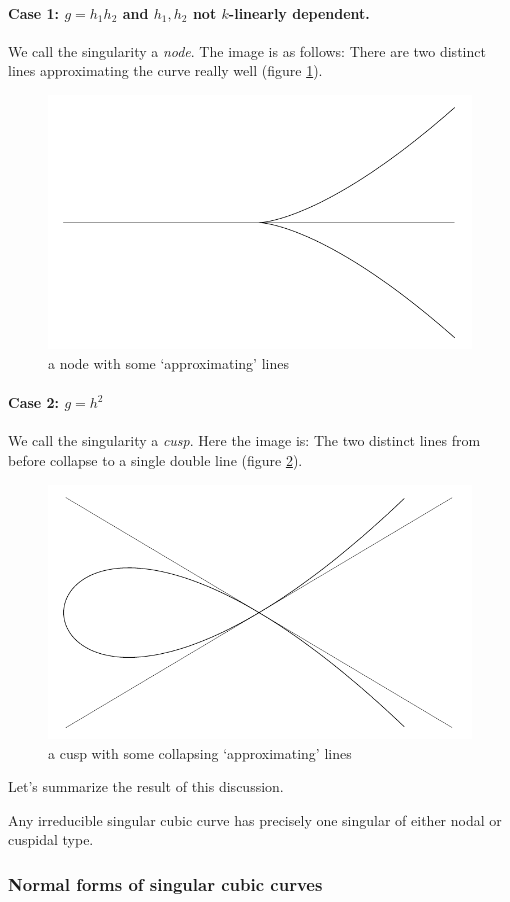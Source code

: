 \paragraph{Case 1: $g=h_1h_2$ and $h_1,h_2$ not $k$-linearly dependent.}
We call the singularity a \emph{node}.
The image is as follows: There are two distinct lines approximating the curve really well (figure \ref{figureNode}).
\begin{figure}
\center
\includegraphics[width=.5\textwidth]{img/nodal.pdf}
\caption{a node with some `approximating' lines}
\label{figureNode}
\end{figure}



\paragraph{Case 2: $g=h^2$}
We call the singularity a \emph{cusp}.
Here the image is: The two distinct lines from before collapse to a single double line (figure \ref{figureCusp}).
\begin{figure}
\center
\includegraphics[width=.5\textwidth]{img/cuspidal.pdf}
\caption{a cusp with some collapsing `approximating' lines}
\label{figureCusp}
\end{figure}


Let's summarize the result of this discussion.

\begin{proposition} \label{propositionClassificationOfSingularCubics}
Any irreducible singular cubic curve has precisely one singular of either nodal or cuspidal type.
\end{proposition}


\subsubsection{Normal forms of singular cubic curves}

